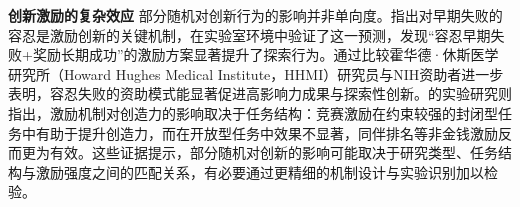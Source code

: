 \textbf{创新激励的复杂效应} \quad 部分随机对创新行为的影响并非单向度。\cite{mansoMotivatingInnovation2011}指出对早期失败的容忍是激励创新的关键机制，\cite{edererPayPerformanceDetrimental2013}在实验室环境中验证了这一预测，发现“容忍早期失败+奖励长期成功”的激励方案显著提升了探索行为。\cite{azoulayIncentivesCreativityEvidence2011}通过比较霍华德·休斯医学研究所（Howard Hughes Medical Institute，HHMI）研究员与NIH资助者进一步表明，容忍失败的资助模式能显著促进高影响力成果与探索性创新。\cite{charnessCreativityIncentives2019}的实验研究则指出，激励机制对创造力的影响取决于任务结构：竞赛激励在约束较强的封闭型任务中有助于提升创造力，而在开放型任务中效果不显著，同伴排名等非金钱激励反而更为有效。这些证据提示，部分随机对创新的影响可能取决于研究类型、任务结构与激励强度之间的匹配关系，有必要通过更精细的机制设计与实验识别加以检验。






